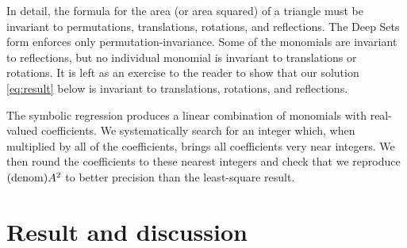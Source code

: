 \documentclass[12pt]{article}
\begin{document}


In detail, the formula for the area (or area squared) of a triangle must be invariant to permutations, translations, rotations, and reflections.
The Deep Sets form enforces only permutation-invariance.
Some of the monomials are invariant to reflections, but no individual monomial is invariant to translations or rotations.
It is left as an exercise to the reader to show that our solution \eqref{eq:result} below is invariant to translations, rotations, and reflections.

The symbolic regression produces a linear combination of monomials with real-valued coefficients.
We systematically search for an integer which, when multiplied by all of the coefficients, brings all coefficients very near integers.
We then round the coefficients to these nearest integers and check that we reproduce $({\rm denom}) A^2$ to better precision than the least-square result.


\section{Result and discussion}\label{sec:result}
\end{document}
